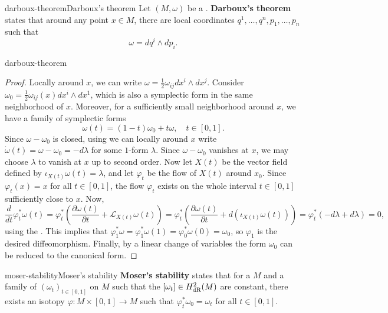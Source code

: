 \begin{topic}{darboux-theorem}{Darboux's theorem}
    Let $(M, \omega)$ be a . \textbf{Darboux's theorem} states that around any point $x \in M$, there are local coordinates $q^1, \ldots, q^n, p_1, \ldots, p_n$ such that
    \[ \omega = dq^i \wedge dp_i . \]
\end{topic}

\begin{example}{darboux-theorem}
    \begin{proof}
        Locally around $x$, we can write $\omega = \frac{1}{2} \omega_{ij} dx^i \wedge dx^j$. Consider $\omega_0 = \frac{1}{2} \omega_{ij}(x) dx^i \wedge dx^1$, which is also a symplectic form in the same neighborhood of $x$. Moreover, for a sufficiently small neighborhood around $x$, we have a family of symplectic forms
        \[ \omega(t) = (1 - t) \omega_0 + t \omega , \quad t \in [0, 1] . \]
        Since $\omega - \omega_0$ is closed, using  we can locally around $x$ write $\dot{\omega}(t) = \omega - \omega_0 = - d \lambda$ for some $1$-form $\lambda$. Since $\omega - \omega_0$ vanishes at $x$, we may choose $\lambda$ to vanish at $x$ up to second order. Now let $X(t)$ be the vector field defined by $\iota_{X(t)} \omega(t) = \lambda$, and let $\varphi_t$ be the flow of $X(t)$ around $x_0$. Since $\varphi_t(x) = x$ for all $t \in [0, 1]$, the flow $\varphi_t$ exists on the whole interval $t \in [0, 1]$ sufficiently close to $x$. Now,
        \[ \frac{d}{dt} \varphi_t^* \omega(t) = \varphi_t^* \left(\frac{\partial \omega(t)}{\partial t} + \mathcal{L}_{X(t)} \omega(t) \right) = \varphi_t^* \left(\frac{\partial \omega(t)}{\partial t} + d(\iota_{X(t)} \omega(t)) \right) = \varphi_t^* \left( -d \lambda + d \lambda \right) = 0 , \]
        using the . This implies that $\varphi_1^* \omega = \varphi_1^* \omega(1) = \varphi_0^* \omega(0) = \omega_0$, so $\varphi_1$ is the desired diffeomorphism. Finally, by a linear change of variables the form $\omega_0$ can be reduced to the canonical form.
    \end{proof}
\end{example}

\begin{topic}{moser-stability}{Moser's stability}
    \textbf{Moser's stability} states that for a   $M$ and a family of  $(\omega_t)_{t \in [0, 1]}$ on $M$ such that the  $[\omega_t] \in H^2_{\textup{dR}}(M)$ are constant, there exists an isotopy $\varphi : M \times [0, 1] \to M$ such that $\varphi_t^* \omega_0 = \omega_t$ for all $t \in [0, 1]$.
\end{topic}

